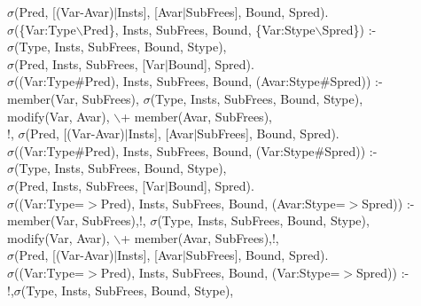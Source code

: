 \documentclass[11pt]{report}
\begin{document}
\begin{sf}
\begin{tabbing}
\hspace{2em}$\sigma$(Pred, [(Var-Avar)$\mid$Insts], [Avar$\mid$SubFrees], Bound, Spred).\\[-0.15ex]
$\sigma$(\{Var:Type$\backslash$Pred\}, Insts, SubFrees, Bound, \{Var:Stype$\backslash$Spred\}) :-\\[-0.15ex]
\hspace{2em}$\sigma$(Type, Insts, SubFrees, Bound, Stype),\\[-0.15ex]
\hspace{2em}$\sigma$(Pred, Insts, SubFrees, [Var$\mid$Bound], Spred).\\[-0.15ex]
$\sigma$((Var:Type\#Pred), Insts, SubFrees, Bound, (Avar:Stype\#Spred)) :-\\[-0.15ex]
\hspace{2em}member(Var, SubFrees), $\sigma$(Type, Insts, SubFrees, Bound, Stype),\\[-0.15ex]
\hspace{2em}modify(Var, Avar), $\backslash$+ member(Avar, SubFrees),\\[-0.15ex]
\hspace{2em}!, $\sigma$(Pred, [(Var-Avar)$\mid$Insts], [Avar$\mid$SubFrees], Bound, Spred).\\[-0.15ex]
$\sigma$((Var:Type\#Pred), Insts, SubFrees, Bound, (Var:Stype\#Spred)) :-\\[-0.15ex]
\hspace{2em}$\sigma$(Type, Insts, SubFrees, Bound, Stype),\\[-0.15ex]
\hspace{2em}$\sigma$(Pred, Insts, SubFrees, [Var$\mid$Bound], Spred).\\[-0.15ex]
$\sigma$((Var:Type=$>$Pred), Insts, SubFrees, Bound, (Avar:Stype=$>$Spred)) :-\\[-0.15ex]
\hspace{2em}member(Var, SubFrees),!, $\sigma$(Type, Insts, SubFrees, Bound, Stype),\\[-0.15ex]
\hspace{2em}modify(Var, Avar), $\backslash$+ member(Avar, SubFrees),!,\\[-0.15ex]
\hspace{2em}$\sigma$(Pred, [(Var-Avar)$\mid$Insts], [Avar$\mid$SubFrees], Bound, Spred).\\[-0.15ex]
$\sigma$((Var:Type=$>$Pred), Insts, SubFrees, Bound, (Var:Stype=$>$Spred)) :-\\[-0.15ex]
\hspace{2em}!,$\sigma$(Type, Insts, SubFrees, Bound, Stype),\\[-0.15ex]

\end{tabbing}
\end{sf}
\end{document}
